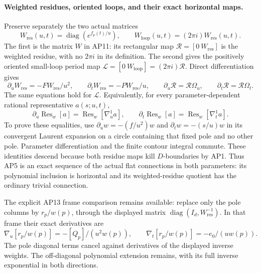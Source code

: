 \paragraph{Weighted residues, oriented loops, and their exact horizontal maps.}
Preserve separately the two actual matrices
\[
 W_{\mathrm{res}}(u,t)=\operatorname{diag}(e^{f_p(t)/u}),\qquad
 W_{\mathrm{loop}}(u,t)=(2\pi i)W_{\mathrm{res}}(u,t).
 \tag{APU11}
\]
The first is the matrix \(W\) in AP11: its rectangular map
\(\mathcal R=[0\ W_{\mathrm{res}}]\) is the weighted residue,
with no \(2\pi i\) in its definition.  The second gives the
positively oriented small-loop period map
\(\mathcal L=[0\ W_{\mathrm{loop}}]=(2\pi i)\mathcal R\).
Direct differentiation gives
\[
 \partial_uW_{\mathrm{res}}=-FW_{\mathrm{res}}/u^2,\qquad
 \partial_tW_{\mathrm{res}}=-PW_{\mathrm{res}}/u,
 \qquad
 \partial_u\mathcal R=\mathcal R\Omega_u,\qquad
 \partial_t\mathcal R=\mathcal R\Omega_t .
 \tag{APU12}
\]
The same equations hold for \(\mathcal L\).
Equivalently, for every parameter-dependent rational representative
\(a(s;u,t)\),
\[
 \partial_u\operatorname{Res}_w[a]
       =\operatorname{Res}_w[\nabla_u^1a],\qquad
 \partial_t\operatorname{Res}_w[a]
       =\operatorname{Res}_w[\nabla_t^1a].
\]
To prove these equalities, use
\(\partial_uw=-(f/u^2)w\) and
\(\partial_tw=-(s/u)w\) in its convergent Laurent expansion
on a circle containing that fixed pole and no other pole.
Parameter differentiation and the finite contour integral commute.
These identities descend because both residue maps kill
\(D\)-boundaries by AP1.
Thus AP5 is an exact sequence of the actual flat connections in
both parameters: its polynomial inclusion is horizontal and its
weighted-residue quotient has the ordinary trivial connection.

The explicit AP13 frame comparison remains available:
replace only the pole columns by \(r_p/w(p)\), through the
displayed matrix
\(\operatorname{diag}(I_d,W_{\mathrm{res}}^{-1})\).
In that frame their exact derivatives are
\[
 \nabla_u[r_p/w(p)]=-[Q_p]/(u^2w(p)),\qquad
 \nabla_t[r_p/w(p)]=-e_0/(uw(p)).
 \tag{APU13}
\]
The pole diagonal terms cancel against derivatives of the displayed
inverse weights.  The off-diagonal polynomial extension remains,
with its full inverse exponential in both directions.

